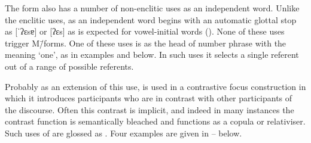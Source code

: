 The form  also has a number of non-enclitic uses as an independent word.
Unlike the enclitic uses,  as an independent word 
begins with an automatic glottal stop as [ˈʔɛsɐ] or [ʔɛs]
as is expected for vowel-initial words ().
None of these uses trigger M\=/forms.
One of these uses is as the head of number phrase with the meaning `one',
as in examples  and  below.
In such uses it selects a single referent out of a range of possible referents.

\begin{exe}
	\label{ex:120715-1, 0.44-0.47}
	\label{ex:130906-1, 3.15}
\end{exe}

Probably as an extension of this use,
 is used in a contrastive focus construction
in which it introduces participants
who are in contrast with other participants of the discourse.
Often this contrast is implicit,
and indeed in many instances the contrast function
is semantically bleached
and  functions as a copula or relativiser.
Such uses of  are glossed as {\esc}.
Four examples are given in -- below.

